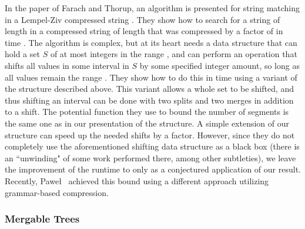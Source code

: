 \documentclass[11pt]{article}
\newcommand{\segments}{{\segment}s}
\newcommand{\segment}{segment}
\newcommand{\set}[1]{\ensuremath{#1}}
\begin{document}
In the paper of Farach and Thorup, an algorithm is presented for string matching in a Lempel-Ziv compressed string \cite{journals/algorithmica/FarachT98}. They show how to search for a string of length  in a compressed string of length  that was compressed by a factor of  in time . The algorithm is complex, but at its heart needs a data structure that can hold a set \set S of at most  integers in the range , and can perform an operation that shifts all values in some interval in \set S by some specified integer amount, so long as all values remain the range . They show how to do this in time  using a variant of the  structure described above. This variant allows a whole set to be shifted, and thus shifting an interval can be done with two splits and two merges in addition to a shift. The potential function they use to bound the number of \segments{} is the same one as in our presentation of the  structure. A simple extension of our structure can speed up the needed shifts by a 
 factor. However, since they do not completely use the aforementioned shifting data structure as a black box (there is an ``unwinding" of some work performed there, among other subtleties), we leave the improvement of the runtime to  only as a conjectured application of our result. Recently, Pawe\l~\cite{DBLP:conf/esa/Gawrychowski11} achieved this bound using a different approach utilizing grammar-based compression.


\subsubsection{Mergable Trees} 
\end{document}
